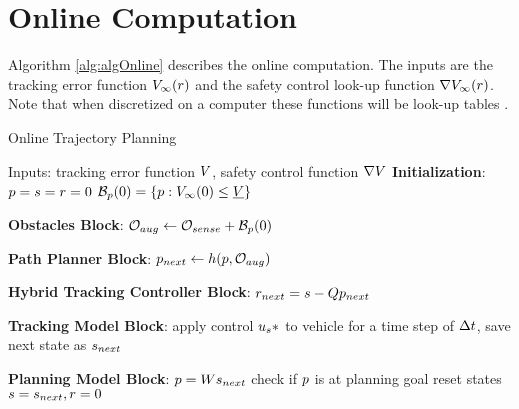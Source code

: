 \section{Online Computation \label{sec:online}}

Algorithm \ref{alg:algOnline} describes the online computation. The inputs are the tracking error function $V_\infty(r)$ and the safety control look-up function $\nabla V_\infty(r)$. Note that when discretized on a computer these functions will be look-up tables . 
\vspace{-.1in}
\begin{algorithm}	
	\caption{Online Trajectory Planning}
	\label{alg:algOnline}
	\begin{algorithmic}[1]
		\STATE Inputs: tracking error function $V$, safety control function $\nabla V$
		\STATE \textbf{Initialization}: \label{ln:Istart}
		\STATE $p = s = r = 0$
		\STATE $\mathcal B_p(0) = \{p: V_\infty(0) \le \underline{V}\}$ \label{ln:Iend}
		
		\STATE \textbf{Obstacles Block}: \label{ln:obsStart}
		\STATE $\mathcal{O}_{aug} \leftarrow \mathcal{O}_{sense} + \mathcal B_p(0)$ \label{ln:obsEnd}
		
		\STATE \textbf{Path Planner Block}:\label{ln:plannerStart}
		\STATE $p_{next} \leftarrow h(p, \mathcal{O}_{aug})$\label{ln:plannerEnd}
		
		\STATE \textbf{Hybrid Tracking Controller Block}:\label{ln:controllerStart}
		\STATE $r_{next} = s - Qp_{next}$
		
		\ELSE {} \ENDIF \label{ln:controllerEnd}
		
		\STATE \textbf{Tracking Model Block}: \label{ln:trackingStart}
		\STATE apply control $u_s*$ to vehicle for a time step of $\Delta t$, save next state as $s_{next}$ \label{ln:trackingEnd}
		
		\STATE \textbf{Planning Model Block}:\label{ln:planningStart}
		\STATE $p = Ws_{next}$
		\STATE check if $p$ is at planning goal
		\STATE reset states $s = s_{next}, r = 0$ \label{ln:planningEnd}
		\ENDWHILE
	\end{algorithmic}
\end{algorithm}
\vspace{-.2in}


